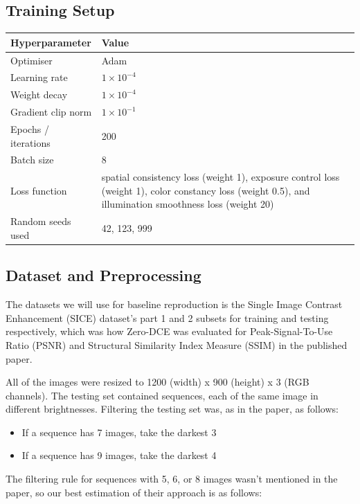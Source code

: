 \documentclass[11pt, letterpaper]{article}
\begin{document}
\subsection{Training Setup}

\begin{tabular}{|l|p{12.5cm}|}
\toprule
\textbf{Hyperparameter} & \textbf{Value} \\
\midrule
Optimiser & Adam \\
Learning rate & $1\times{10}^{-4}$ \\
Weight decay & $1\times{10}^{-4}$ \\
Gradient clip norm & $1\times{10}^{-1}$ \\
Epochs / iterations & 200 \\
Batch size & 8 \\
Loss function & spatial consistency loss (weight 1), exposure control loss (weight 1), color constancy loss (weight 0.5), and illumination smoothness loss (weight 20) \\
Random seeds used & 42, 123, 999 \\
\bottomrule
\end{tabular}

\subsection{Dataset and Preprocessing}

The datasets we will use for baseline reproduction is the Single Image Contrast Enhancement (SICE) dataset's part 1 and 2 subsets for training and testing respectively, which was how Zero-DCE was evaluated for Peak-Signal-To-Use Ratio (PSNR) and Structural Similarity Index Measure (SSIM) in the published paper.

All of the images were resized to 1200 (width) x 900 (height) x 3 (RGB channels). The testing set contained sequences, each of the same image in different brightnesses. Filtering the testing set was, as in the paper, as follows:

\begin{itemize}
    \item If a sequence has 7 images, take the darkest 3
    \item If a sequence has 9 images, take the darkest 4
\end{itemize}

The filtering rule for sequences with 5, 6, or 8 images wasn't mentioned in the paper, so our best estimation of their approach is as follows:
\end{document}
